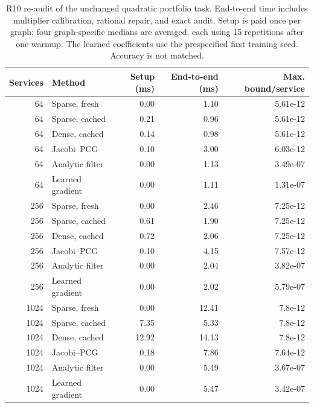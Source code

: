 \begin{table}[p]\centering\small
\caption{R10 re-audit of the unchanged quadratic portfolio task. End-to-end time includes multiplier calibration, rational repair, and exact audit. Setup is paid once per graph; four graph-specific medians are averaged, each using 15 repetitions after one warmup. The learned coefficients use the prespecified first training seed. Accuracy is not matched.}\label{tab:r10-cached}
\begin{tabular}{rlrrr}\toprule
Services & Method & Setup (ms) & End-to-end (ms) & Max. bound/service\\\midrule
64 & Sparse, fresh & 0.00 & 1.10 & 5.61e-12 \\
64 & Sparse, cached & 0.21 & 0.96 & 5.61e-12 \\
64 & Dense, cached & 0.14 & 0.98 & 5.61e-12 \\
64 & Jacobi--PCG & 0.10 & 3.00 & 6.03e-12 \\
64 & Analytic filter & 0.00 & 1.13 & 3.49e-07 \\
64 & Learned gradient & 0.00 & 1.11 & 1.31e-07 \\
256 & Sparse, fresh & 0.00 & 2.46 & 7.25e-12 \\
256 & Sparse, cached & 0.61 & 1.90 & 7.25e-12 \\
256 & Dense, cached & 0.72 & 2.06 & 7.25e-12 \\
256 & Jacobi--PCG & 0.10 & 4.15 & 7.57e-12 \\
256 & Analytic filter & 0.00 & 2.04 & 3.82e-07 \\
256 & Learned gradient & 0.00 & 2.02 & 5.79e-07 \\
1024 & Sparse, fresh & 0.00 & 12.41 & 7.8e-12 \\
1024 & Sparse, cached & 7.35 & 5.33 & 7.8e-12 \\
1024 & Dense, cached & 12.92 & 14.13 & 7.8e-12 \\
1024 & Jacobi--PCG & 0.18 & 7.86 & 7.64e-12 \\
1024 & Analytic filter & 0.00 & 5.49 & 3.67e-07 \\
1024 & Learned gradient & 0.00 & 5.47 & 3.42e-07 \\
\bottomrule\end{tabular}\end{table}
